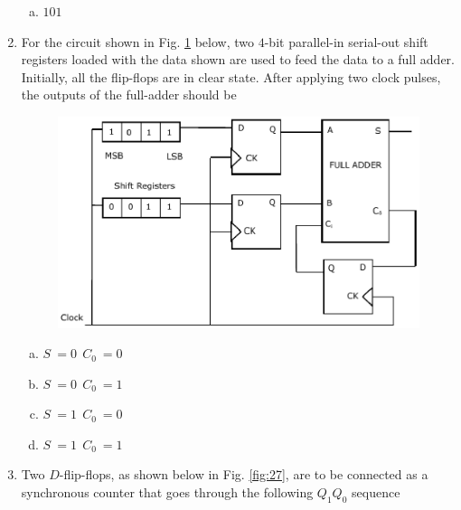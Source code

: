\documentclass[journal,12pt,twocolumn]{IEEEtran}
\begin{document}
\begin{enumerate}
\begin{enumerate}[(a)]
\item $
101
$


\end{enumerate}


\item For the circuit shown in Fig. \ref{fig:26} below, two $4$-bit parallel-in serial-out shift registers loaded with the data shown are used to feed the data to a full adder. Initially, all the flip-flops are in clear state. After applying two clock pulses, the outputs of the full-adder should be

\begin{figure}

\centering

\includegraphics[width=\columnwidth]{./figs/30.eps}

\caption{}

\label{fig:26}

\end{figure} 



\begin{enumerate}[(a)]


\item $
S \ =0 \ \ C_0 \ = 0
$

\item $
S \ =0 \ \ C_0 \ = 1
$

\item $
S \ =1 \ \ C_0 \ = 0
$

\item $
S \ =1 \ \ C_0 \ = 1
$
\end{enumerate}

\item Two $D$-flip-flops, as shown below in Fig. \ref{fig:27}, are to be connected as a synchronous counter that goes through the following $Q_1Q_0$ sequence


\end{enumerate}
\end{document}
